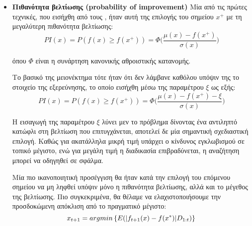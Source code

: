  	\begin{itemize}
 		\item \textbf{Πιθανότητα βελτίωσης (probability of improvement)} Μία από τις πρώτες τεχνικές, που εισήχθη από τους \citet{Kushner}, ήταν αυτή της επιλογής του σημείου $x^+$ με τη μεγαλύτερη πιθανότητα βελτίωσης:
 		\begin{equation}
 		PI(x)= P(f(x) \geq f(x^+)) = \Phi \Big(\frac{\mu(x) - f(x^+)}{\sigma(x)}\Big)
 		\end{equation}
 		
 		όπου $\Phi$ είναι η συνάρτηση κανονικής αθροιστικής κατανομής.
 		
 		Το βασικό της μειονέκτημα τότε ήταν ότι δεν λάμβανε καθόλου υπόψιν της το στοιχείο της εξερεύνησης, το οποίο εισήχθη μέσω της παραμέτρου $\xi$ ως εξής:
 	    \begin{equation}
 	    PI(x)= P(f(x) \geq f(x^+)) = \Phi \Big(\frac{\mu(x) - f(x^+) - \xi}{\sigma(x)} \Big)
 	    \end{equation}
 		
 		Η εισαγωγή της παραμέτρου $\xi$ λύνει μεν το πρόβλημα δίνοντας ένα αντιληπτό κατώφλι στη βελτίωση που επιτυγχάνεται, αποτελεί δε μία σημαντική σχεδιαστική επιλογή. Καθώς για ακατάλληλα μικρή τιμή υπάρχει ο κίνδυνος εγκλωβισμού σε τοπικό μέγιστο, ενώ για μεγάλη τιμή η διαδικασία επιβραδύνεται, η αναζήτηση μπορεί να οδηγηθεί σε σφάλμα.
 		
 		Μία πιο ικανοποιητική προσέγγιση θα ήταν κατά την επιλογή του επόμενου σημείου να μη ληφθεί υπόψιν μόνο η πιθανότητα βελτίωσης, αλλά και το μέγεθος της βελτίωσης. Πιο συγκεκριμένα, θα θέλαμε να ελαχιστοποιήσουμε την προσδοκώμενη απόκλιση από το πραγματικό μέγιστο:
 		\begin{equation}
 		x_{t+1}= argmin \left \{ E(\lvert f_{t+1}(x) -f(x^*)\rvert D_{1:t}) \right \}
 		\end{equation}
 		

\end{itemize}
